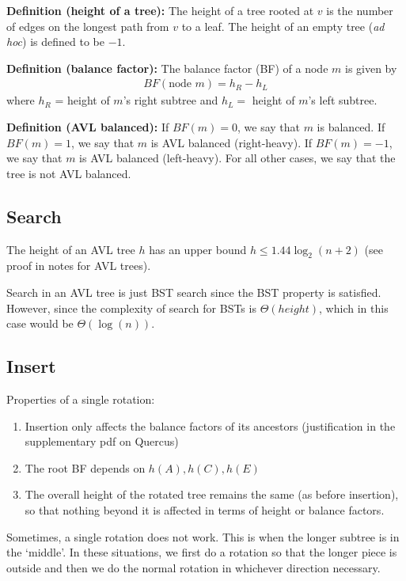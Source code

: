 \documentclass[11pt]{article}
\begin{document}
\textbf{Definition (height of a tree):} The height of a tree rooted at $v$ is the number of edges on the longest path from $v$ to a leaf. The height of an empty tree (\emph{ad hoc}) is defined to be $-1$.

\textbf{Definition (balance factor):} The balance factor (BF) of a node $m$ is given by
\begin{align*}
    BF(\text{node } m) = h_R - h_L 
\end{align*}
where $h_R$ = height of $m$'s right subtree and $h_L =$ height of $m$'s left subtree. 

\textbf{Definition (AVL balanced):} If $BF(m) = 0$, we say that $m$ is balanced. If $BF(m) = 1$, we say that $m$ is AVL balanced (right-heavy). If $BF(m) = -1$, we say that $m$ is AVL balanced (left-heavy). For all other cases, we say that the tree is not AVL balanced. 

\subsection{Search}

The height of an AVL tree $h$ has an upper bound $h \leq 1.44 \log_2(n+2)$ (see proof in notes for AVL trees).

Search in an AVL tree is just BST search since the BST property is satisfied. However, since the complexity of search for BSTs is $\Theta(height)$, which in this case would be $\Theta(\log(n))$. 

\subsection{Insert}
Properties of a single rotation: 
\begin{enumerate}
    \item Insertion only affects the balance factors of its ancestors (justification in the supplementary pdf on Quercus)
    \item The root BF depends on $h(A), h(C), h(E)$
    \item The overall height of the rotated tree remains the same (as before insertion), so that nothing beyond it is affected in terms of height or balance factors. 
\end{enumerate}
Sometimes, a single rotation does not work. This is when the longer subtree is in the `middle'. In these situations, we first do a rotation so that the longer piece is outside and then we do the normal rotation in whichever direction necessary. 
\end{document}
